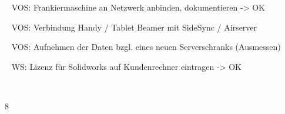 {{	\textbullet~ VOS: Frankiermaschine an Netzwerk anbinden, dokumentieren -> OK\par
	\textbullet~ VOS: Verbindung Handy / Tablet Beamer mit SideSync / Airserver\par
	\textbullet~ VOS: Aufnehmen der Daten bzgl. eines neuen Serverschranks (Ausmessen)\par
	\textbullet~ WS: Lizenz für Solidworks auf Kundenrechner eintragen -> OK\par
	\textbullet~ 
	}{}{8}
}{}
\Unterschrift
\newpage